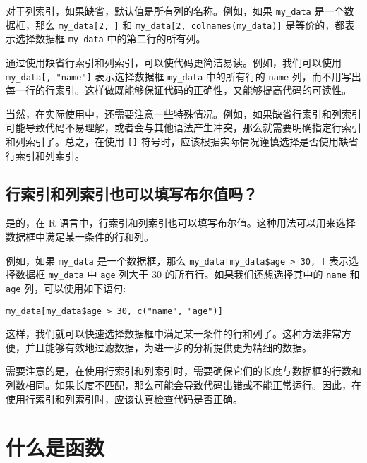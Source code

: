 \documentclass[
  letterpaper,
  DIV=11,
  numbers=noendperiod]{scrreprt}
\begin{document}
对于列索引，如果缺省，默认值是所有列的名称。例如，如果 \texttt{my\_data}
是一个数据框，那么 \texttt{my\_data{[}2,\ {]}} 和
\texttt{my\_data{[}2,\ colnames(my\_data){]}} 是等价的，都表示选择数据框
\texttt{my\_data} 中的第二行的所有列。

通过使用缺省行索引和列索引，可以使代码更简洁易读。例如，我们可以使用
\texttt{my\_data{[},\ "name"{]}} 表示选择数据框 \texttt{my\_data}
中的所有行的 \texttt{name}
列，而不用写出每一行的行索引。这样做既能够保证代码的正确性，又能够提高代码的可读性。

当然，在实际使用中，还需要注意一些特殊情况。例如，如果缺省行索引和列索引可能导致代码不易理解，或者会与其他语法产生冲突，那么就需要明确指定行索引和列索引了。总之，在使用
\texttt{{[}{]}}
符号时，应该根据实际情况谨慎选择是否使用缺省行索引和列索引。

\hypertarget{ux884cux7d22ux5f15ux548cux5217ux7d22ux5f15ux4e5fux53efux4ee5ux586bux5199ux5e03ux5c14ux503cux5417}{%
\section{行索引和列索引也可以填写布尔值吗？}\label{ux884cux7d22ux5f15ux548cux5217ux7d22ux5f15ux4e5fux53efux4ee5ux586bux5199ux5e03ux5c14ux503cux5417}}

是的，在 R
语言中，行索引和列索引也可以填写布尔值。这种用法可以用来选择数据框中满足某一条件的行和列。

例如，如果 \texttt{my\_data} 是一个数据框，那么
\texttt{my\_data{[}my\_data\$age\ \textgreater{}\ 30,\ {]}}
表示选择数据框 \texttt{my\_data} 中 \texttt{age} 列大于 30
的所有行。如果我们还想选择其中的 \texttt{name} 和 \texttt{age}
列，可以使用如下语句:

\begin{verbatim}
my_data[my_data$age > 30, c("name", "age")]
\end{verbatim}

这样，我们就可以快速选择数据框中满足某一条件的行和列了。这种方法非常方便，并且能够有效地过滤数据，为进一步的分析提供更为精细的数据。

需要注意的是，在使用行索引和列索引时，需要确保它们的长度与数据框的行数和列数相同。如果长度不匹配，那么可能会导致代码出错或不能正常运行。因此，在使用行索引和列索引时，应该认真检查代码是否正确。

\hypertarget{ux4ec0ux4e48ux662fux51fdux6570}{%
\chapter{什么是函数}\label{ux4ec0ux4e48ux662fux51fdux6570}}
\end{document}
